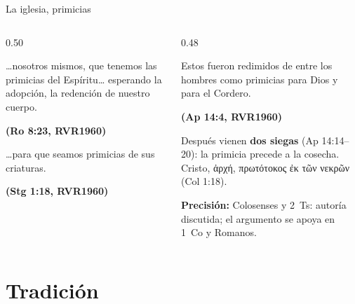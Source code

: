 \documentclass[hyperref={bookmarks=false},aspectratio=169]{beamer}
\newcommand{\grc}[1]{\foreignlanguage{ancientgreek}{#1}}
\newcommand{\fuente}[1]{\par\hfill{\upshape\bfseries\footnotesize\textcolor{tierraroja}{#1}}}
\newcommand{\destacar}[1]{\textbf{\textcolor{tierraroja}{#1}}}
\newcommand{\precision}[1]{{\footnotesize\color{sepia}\textbf{Precisión:} #1}}
\begin{document}
\begin{frame}{La iglesia, primicias}
\begin{columns}[t,onlytextwidth]
\begin{column}{0.50\textwidth}
\begin{cita}\ldots{}nosotros mismos, que tenemos las primicias del Espíritu\ldots{} esperando la adopción, la redención de nuestro cuerpo.\fuente{(Ro 8:23, RVR1960)}\end{cita}
\begin{cita}\ldots{}para que seamos primicias de sus criaturas.\fuente{(Stg 1:18, RVR1960)}\end{cita}
\end{column}
\begin{column}{0.48\textwidth}
\begin{cita}Estos fueron redimidos de entre los hombres como primicias para Dios y para el Cordero.\fuente{(Ap 14:4, RVR1960)}\end{cita}
\scriptsize\RaggedRight Después vienen \destacar{dos siegas} (Ap 14:14--20): la primicia precede a la cosecha. Cristo, \grc{ἀρχή, πρωτότοκος ἐκ τῶν νεκρῶν} (Col 1:18).\par\smallskip
\precision{Colosenses y 2~Ts: autoría discutida; el argumento se apoya en 1~Co y Romanos.}
\end{column}
\end{columns}
\end{frame}

\section{Tradición}
\end{document}
